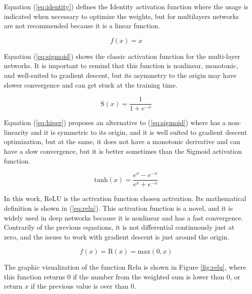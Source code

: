         


Equation (\ref{eq:identity}) defines the Identity activation function where the usage is indicated when necessary to optimize the weights, but for multilayers networks are not recommended because it is a linear function. 


\begin{equation}\label{eq:identity}
    f(x) = x
\end{equation}


Equation (\ref{eq:sigmoid}) shows the classic activation function for the multi-layer networks. It is important to remind that this function is nonlinear, monotonic, and well-suited to gradient descent, but its asymmetry to the origin may have slower convergence and can get stuck at the training time.     


\begin{equation}\label{eq:sigmoid}
    \mathrm{S}(x) = \frac{1}{1+e^{-x}}
\end{equation}

        
Equation (\ref{eq:hiper}) proposes an alternative to (\ref{eq:sigmoid}) where has a non-linearity and it is symmetric to its origin, and it is well suited to gradient descent optimization, but at the same, it does not have a monotonic derivative and can have a slow convergence, but it is better sometimes than the Sigmoid activation function.


\begin{equation}\label{eq:hiper}
 \mathrm{tanh}(x) = \frac{e^{x}-e^{-x}}{e^{x}+e^{-x}}
\end{equation}


    


In this work, ReLU is the activation function chosen activation. Its mathematical definition is shown in (\ref{eq:relu}). This activation function is a novel, and it is widely used in deep networks because it is nonlinear and has a fast convergence. Contrarily of the previous equations, it is not differential continuously just at zero, and the issues to work with gradient descent is just around the origin. 


\begin{equation}
\label{eq:relu}
    f(x) = \mathrm{R}(x) = \mathrm{max}(0,x)
\end{equation}


The graphic visualization of the function Relu is shown in Figure \ref{fig:relu}, where this function returns $0$ if the number from the weighted sum is lower than $0$, or return $x$ if the previous value is over than $0$.


